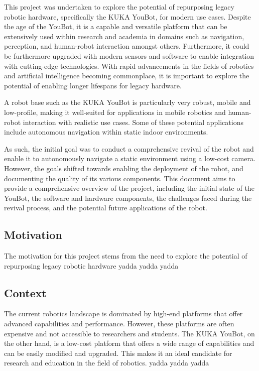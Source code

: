 \documentclass[a4paper, 12pt]{article}
\newif\ifshowadi
\newcommand{\adi}[1]{\ifshowadi\textcolor{red}{#1}\fi}
\begin{document}
    \adi{i dont really know how to extend this actually}

    This project was undertaken to explore the potential of repurposing legacy robotic hardware, specifically the KUKA YouBot, for modern use cases. Despite the age of the YouBot, it is a capable and versatile platform that can be extensively used within research and academia in domains such as navigation, perception, and human-robot interaction amongst others. Furthermore, it could be furthermore upgraded with modern sensors and software to enable integration with cutting-edge technologies. With rapid advancements in the fields of robotics and artificial intelligence becoming commonplace, it is important to explore the potential of enabling longer lifespans for legacy hardware.

    A robot base such as the KUKA YouBot is particularly very robust, mobile and low-profile, making it well-suited for applications in mobile robotics and human-robot interaction with realistic use cases. Some of these potential applications include autonomous navigation within static indoor environments. 
    
    As such, the initial goal was to conduct a comprehensive revival of the robot and enable it to autonomously navigate a static environment using a low-cost camera. However, the goals shifted towards enabling the deployment of the robot, and documenting the quality of its various components. This document aims to provide a comprehensive overview of the project, including the initial state of the YouBot, the software and hardware components, the challenges faced during the revival process, and the potential future applications of the robot.

    \subsection{Motivation}

    The motivation for this project stems from the need to explore the potential of repurposing legacy robotic hardware yadda yadda yadda

    \subsection{Context}

    The current robotics landscape is dominated by high-end platforms that offer advanced capabilities and performance. However, these platforms are often expensive and not accessible to researchers and students. The KUKA YouBot, on the other hand, is a low-cost platform that offers a wide range of capabilities and can be easily modified and upgraded. This makes it an ideal candidate for research and education in the field of robotics. yadda yadda yadda
\end{document}
